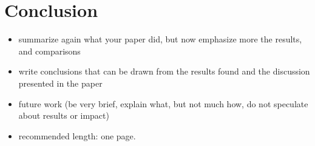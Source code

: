 \documentclass[]{nsm-thesis}
\begin{document}
\chapter{Conclusion}


\begin{itemize}
\item summarize again what your paper did, but now emphasize more the results, and comparisons
\item write conclusions that can be drawn from the results found and the discussion presented in the paper
\item future work (be very brief, explain what, but not much how, do not speculate about results or impact)
\item recommended length: one page.
\end{itemize}



\cleardoublepage

\listofabbreviations
\clearpage

\listoffigures
\clearpage

\listoftables
\clearpage

\printbibliography
\end{document}
